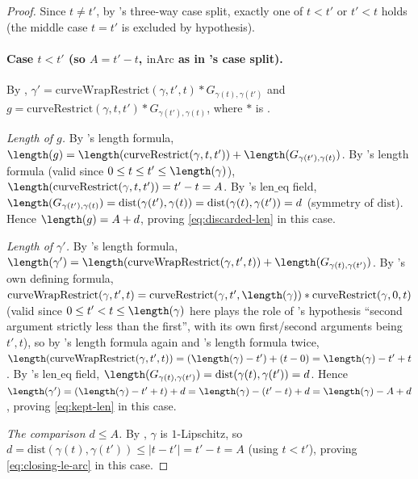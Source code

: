 \begin{proof}
  Since $t \ne t'$, by 's three-way case split, exactly one of $t<t'$ or $t'<t$
  holds (the middle case $t=t'$ is excluded by hypothesis).

  \paragraph{Case $t<t'$ (so $A=t'-t$, $\mathrm{inArc}$ as in 's case split).} By
  , $\gamma' = \mathrm{curveWrapRestrict}(\gamma,t',t) *
  G_{\gamma(t),\gamma(t')}$ and $g = \mathrm{curveRestrict}(\gamma,t,t') *
  G_{\gamma(t'),\gamma(t)}$, where $*$ is .

  \emph{Length of $g$.} By 's length formula,
  $\length(g) = \length(\mathrm{curveRestrict}(\gamma,t,t')) + \length(G_{\gamma(t'),\gamma(t)})$.
  By 's length formula (valid since $0\le t\le t'\le\length(\gamma)$),
  $\length(\mathrm{curveRestrict}(\gamma,t,t')) = t'-t = A$. By 's
  $\mathrm{len\_eq}$ field, $\length(G_{\gamma(t'),\gamma(t)}) = \mathrm{dist}(\gamma(t'),\gamma(t))
  = \mathrm{dist}(\gamma(t),\gamma(t')) = d$ (symmetry of $\mathrm{dist}$). Hence
  $\length(g) = A+d$, proving \eqref{eq:discarded-len} in this case.

  \emph{Length of $\gamma'$.} By 's length formula, $\length(\gamma') =
  \length(\mathrm{curveWrapRestrict}(\gamma,t',t)) + \length(G_{\gamma(t),\gamma(t')})$. By
  's own defining formula, $\mathrm{curveWrapRestrict}(\gamma,t',t) =
  \mathrm{curveRestrict}(\gamma,t',\length(\gamma)) * \mathrm{curveRestrict}(\gamma,0,t)$ (valid
  since $0\le t'<t\le\length(\gamma)$ here plays the role of 's
  hypothesis ``second argument strictly less than the first'', with its own first/second arguments
  being $t',t$), so by 's length formula again and 's
  length formula twice, $\length(\mathrm{curveWrapRestrict}(\gamma,t',t)) =
  (\length(\gamma)-t')+(t-0) = \length(\gamma)-t'+t$. By 's
  $\mathrm{len\_eq}$ field, $\length(G_{\gamma(t),\gamma(t')}) = \mathrm{dist}(\gamma(t),\gamma(t'))
  = d$. Hence $\length(\gamma') = (\length(\gamma)-t'+t)+d = \length(\gamma)-(t'-t)+d =
  \length(\gamma)-A+d$, proving \eqref{eq:kept-len} in this case.

  \emph{The comparison $d \le A$.} By , $\gamma$ is $1$-Lipschitz, so
  $d = \mathrm{dist}(\gamma(t),\gamma(t')) \le |t-t'| = t'-t = A$ (using $t<t'$), proving
  \eqref{eq:closing-le-arc} in this case.


\end{proof}
